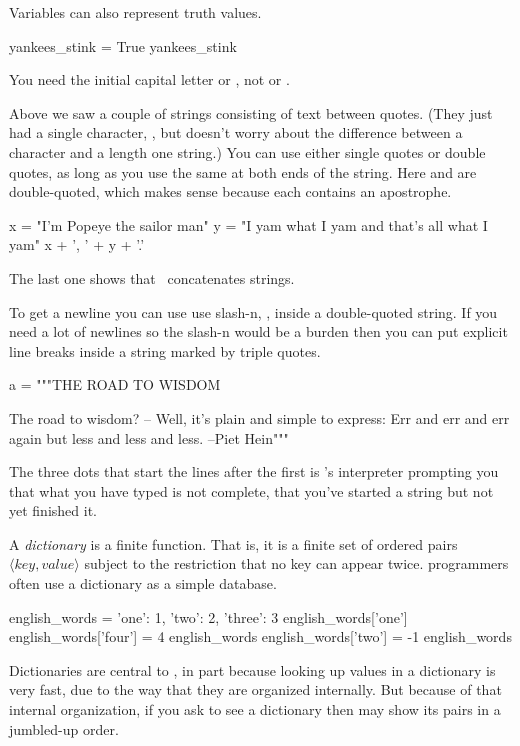 Variables can also represent truth values.
\begin{pythonconsole}
yankees_stink = True
yankees_stink
\end{pythonconsole}
You need the initial capital letter\Dash
{}
or , not
or .
 
Above we saw a couple of strings consisting of text between quotes.
(They just had a single character, ,
but \python{} doesn't worry about the difference between a character
and a length one string.)
You can use either single quotes or double quotes, as long as you use
the same at both ends of the string. 
Here  and 
are double-quoted, which makes sense because each contains
an apostrophe. 
\begin{pythonconsole}
x = "I'm Popeye the sailor man"
y = "I yam what I yam and that's all what I yam"
x + ', ' + y + '.'
\end{pythonconsole}
The last one shows that~\inlinecode{+} 
concatenates strings. 

To get a newline you can use use slash-n, \inlinecode{\\n}, 
inside a double-quoted string.
If you need a lot of newlines so the slash-n would be a burden then
you can put explicit line breaks inside a string marked by triple quotes.
\begin{pythonconsole}
a = """THE ROAD TO WISDOM
 
The road to wisdom?
-- Well, it's plain
and simple to express:
Err
and err
and err again
but less
and less
and less. --Piet Hein"""
\end{pythonconsole} 
The three dots that start the lines after the first
is \python's
interpreter prompting you that what you have typed is not complete,
that you've started a string but not yet finished it.

A \python{} \textit{dictionary} is a finite function.
That is, it is a finite
set of ordered pairs $\langle\textit{key},\textit{value}\rangle$ subject 
to the restriction that no key can appear twice.
\python{} programmers often use a dictionary as a simple database.
\begin{pythonconsole}
english_words = {'one': 1, 'two': 2, 'three': 3}
english_words['one']
english_words['four'] = 4  
english_words
english_words['two'] = -1
english_words
\end{pythonconsole} 
Dictionaries are central to \python, in part because looking up values 
in a dictionary is very fast, due to the way that they are 
organized internally.
But because of that internal organization,
if you ask to see a dictionary then \python{} may show its pairs in 
a jumbled-up order. %

